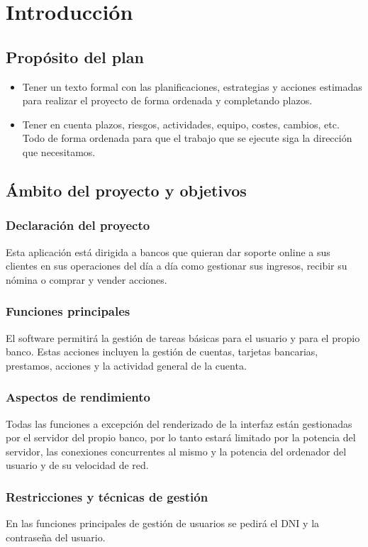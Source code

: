 \section{Introducción}
\subsection{Propósito del plan}
\begin{itemize}
	\item Tener un texto formal con las planificaciones, estrategias y acciones estimadas para realizar el proyecto de forma ordenada y completando plazos.
	\item Tener en cuenta plazos, riesgos, actividades, equipo, costes, cambios, etc. Todo de forma ordenada para que el trabajo que se ejecute siga la dirección que necesitamos.
\end{itemize}

\subsection{Ámbito del proyecto y objetivos}
\subsubsection{Declaración del proyecto}
Esta aplicación está dirigida a bancos que quieran dar soporte online a sus clientes en sus operaciones del día a día como gestionar sus ingresos, recibir su nómina o comprar y vender acciones.
\subsubsection{Funciones principales}
El software permitirá la gestión de tareas básicas para el usuario y para el propio banco. Estas acciones incluyen la gestión de cuentas, tarjetas bancarias, prestamos, acciones y la actividad general de la cuenta.
\subsubsection{Aspectos de rendimiento}
Todas las funciones a excepción del renderizado de la interfaz están gestionadas por el servidor del propio banco, por lo tanto estará limitado por la potencia del servidor, las conexiones concurrentes al mismo y la potencia del ordenador del usuario y de su velocidad de red.
\subsubsection{Restricciones y técnicas de gestión}
En las funciones principales de gestión de usuarios se pedirá el DNI y la contraseña del usuario.


